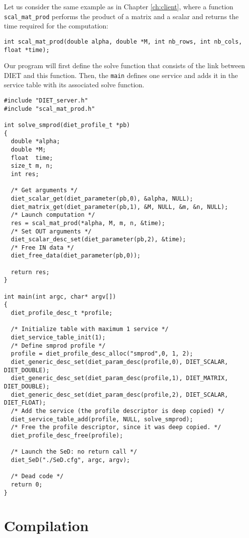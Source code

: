 Let us consider the same example as in Chapter \ref{ch:client}, where
a function \texttt{scal\_mat\_prod} performs the product of a matrix
and a scalar and returns the time required for the computation: {\footnotesize
\begin{verbatim}
int scal_mat_prod(double alpha, double *M, int nb_rows, int nb_cols, float *time);
\end{verbatim}
}
Our program will first define the solve function that consists of the link
between DIET and this function. Then, the \texttt{main} defines one service and
adds it in the service table with its associated solve function.
{\footnotesize
\begin{verbatim}
#include "DIET_server.h"
#include "scal_mat_prod.h"

int solve_smprod(diet_profile_t *pb)
{
  double *alpha;
  double *M;
  float  time;
  size_t m, n;
  int res;

  /* Get arguments */
  diet_scalar_get(diet_parameter(pb,0), &alpha, NULL);
  diet_matrix_get(diet_parameter(pb,1), &M, NULL, &m, &n, NULL);
  /* Launch computation */
  res = scal_mat_prod(*alpha, M, m, n, &time);
  /* Set OUT arguments */
  diet_scalar_desc_set(diet_parameter(pb,2), &time);
  /* Free IN data */
  diet_free_data(diet_parameter(pb,0));

  return res;
}

int main(int argc, char* argv[])
{
  diet_profile_desc_t *profile;
  
  /* Initialize table with maximum 1 service */
  diet_service_table_init(1);
  /* Define smprod profile */
  profile = diet_profile_desc_alloc("smprod",0, 1, 2);
  diet_generic_desc_set(diet_param_desc(profile,0), DIET_SCALAR, DIET_DOUBLE);
  diet_generic_desc_set(diet_param_desc(profile,1), DIET_MATRIX, DIET_DOUBLE);
  diet_generic_desc_set(diet_param_desc(profile,2), DIET_SCALAR, DIET_FLOAT);
  /* Add the service (the profile descriptor is deep copied) */
  diet_service_table_add(profile, NULL, solve_smprod);
  /* Free the profile descriptor, since it was deep copied. */
  diet_profile_desc_free(profile);

  /* Launch the SeD: no return call */
  diet_SeD("./SeD.cfg", argc, argv);

  /* Dead code */
  return 0;
}
\end{verbatim}
}

\section{Compilation}
\label{sec:sv_comp}

